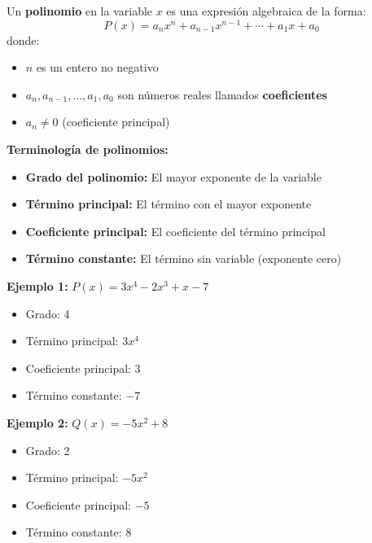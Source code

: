 
\begin{definition}
Un \textbf{polinomio} en la variable $x$ es una expresión algebraica de la forma:
$$P(x) = a_n x^n + a_{n-1} x^{n-1} + \cdots + a_1 x + a_0$$
donde:
\begin{itemize}
\item $n$ es un entero no negativo
\item $a_n, a_{n-1}, \ldots, a_1, a_0$ son números reales llamados \textbf{coeficientes}
\item $a_n \neq 0$ (coeficiente principal)
\end{itemize}
\end{definition}

\textbf{Terminología de polinomios:}
\begin{itemize}
\item \textbf{Grado del polinomio:} El mayor exponente de la variable
\item \textbf{Término principal:} El término con el mayor exponente
\item \textbf{Coeficiente principal:} El coeficiente del término principal
\item \textbf{Término constante:} El término sin variable (exponente cero)
\end{itemize}

\begin{example}
\textbf{Ejemplo 1:} $P(x) = 3x^4 - 2x^3 + x - 7$
\begin{itemize}
\item Grado: 4
\item Término principal: $3x^4$
\item Coeficiente principal: 3
\item Término constante: $-7$
\end{itemize}

\textbf{Ejemplo 2:} $Q(x) = -5x^2 + 8$
\begin{itemize}
\item Grado: 2
\item Término principal: $-5x^2$
\item Coeficiente principal: $-5$
\item Término constante: 8
\end{itemize}
\end{example}


